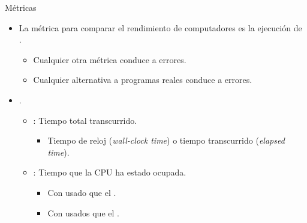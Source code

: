 \begin{frame}[t]{Métricas}
\begin{itemize}
  \item La  métrica  para comparar el rendimiento de computadores 
        es la ejecución de .
    \begin{itemize}
      \item Cualquier otra métrica conduce a errores.
      \item Cualquier alternativa a programas reales conduce a errores.
    \end{itemize}
  \item {}.
    \begin{itemize}
      \item {}: 
            Tiempo total transcurrido.
        \begin{itemize}
          \item Tiempo de reloj (\emph{wall-clock time}) o tiempo transcurrido (\emph{elapsed time}).
        \end{itemize}
      \item {}: 
            Tiempo que la CPU ha estado ocupada.
        \begin{itemize}
          \item Con  usado  
                que el .
          \item Con  usados 
                que el .
        \end{itemize}
    \end{itemize}
\end{itemize}
\end{frame}

